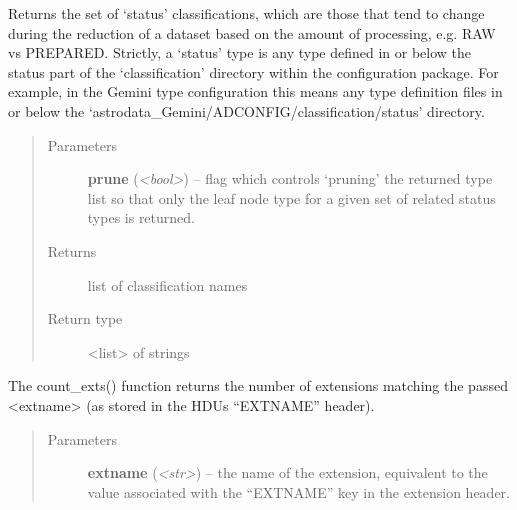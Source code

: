 \documentclass[letterpaper,10pt,english]{sphinxmanual}
\begin{document}
\begin{fulllineitems}
\begin{fulllineitems}
\begin{quote}
\begin{description}
\end{description}\end{quote}

\end{fulllineitems}


\begin{fulllineitems}
\label{astro_class:astrodata.AstroData.AstroData.status}
Returns the set of `status' classifications, which are those that 
tend to change during the reduction of a dataset based on 
the amount of processing, e.g. RAW vs PREPARED.  Strictly, a `status' 
type is any type defined in or below the status part of the 
`classification' directory within the configuration package. For 
example, in the Gemini type configuration this means any type definition
files in or below the `astrodata\_Gemini/ADCONFIG/classification/status'
directory.
\begin{quote}\begin{description}
\item[{Parameters}] \leavevmode
\textbf{prune} (\emph{\textless{}bool\textgreater{}}) -- flag which controls `pruning' the returned type list 
so that only the leaf node type for a given set of 
related status types is returned.

\item[{Returns}] \leavevmode
list of classification names

\item[{Return type}] \leavevmode
\textless{}list\textgreater{} of strings

\end{description}\end{quote}

\end{fulllineitems}


\begin{fulllineitems}
\label{astro_class:astrodata.AstroData.AstroData.count_exts}
The count\_exts() function returns the number of extensions matching the
passed \textless{}extname\textgreater{} (as stored in the HDUs ``EXTNAME'' header).
\begin{quote}\begin{description}
\item[{Parameters}] \leavevmode
\textbf{extname} (\emph{\textless{}str\textgreater{}}) -- the name of the extension, equivalent to the
value associated with the ``EXTNAME'' key in the extension
header.


\end{description}
\end{quote}
\end{fulllineitems}
\end{fulllineitems}
\end{document}

